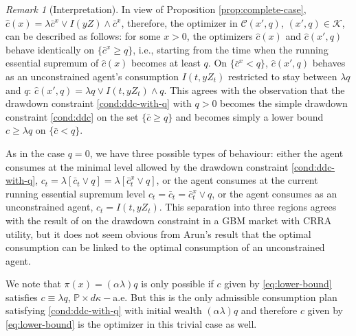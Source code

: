\documentclass[11pt, oneside]{article}   	%
\theoremstyle{plain}
\theoremstyle{definition}
\theoremstyle{remark}
\newtheorem{rem}[thm]{Remark}
\begin{document}
\begin{rem}[Interpretation]
In view of Proposition \ref{prop:complete-case}, $\hat{c}(x)=\lambda\bar{c}^x\vee I(yZ)\wedge \bar{c}^x$, therefore, the optimizer in $\mathcal{C}(x',q)$, $(x',q)\in\mathcal{K}$, can be described as follows: for some $x>0$, the optimizers $\hat{c}(x)$ and $\hat{c}(x',q)$ behave identically on $\{\bar{c}^x\geq q\}$, i.e., starting from the time when the running essential supremum of $\hat{c}(x)$ becomes at least $q$. On $\{\bar{c}^x< q\}$, $\hat{c}(x',q)$ behaves as an unconstrained agent's consumption $I(t,yZ_t)$ restricted to stay between $\lambda q$ and $q$: $\hat{c}(x',q)=\lambda q\vee I(t,yZ_t)\wedge q$. This agrees with the observation that the drawdown constraint \eqref{cond:ddc-with-q} with $q>0$ becomes the simple drawdown constraint \eqref{cond:ddc} on the set $\{\bar{c}\geq q\}$ and becomes simply a lower bound $c\geq \lambda q$ on $\{\bar{c}< q\}$.

As in the case $q=0$, we have three possible types of behaviour: either the agent consumes at the minimal level allowed by the drawdown constraint \eqref{cond:ddc-with-q}, $c_t=\lambda[\bar{c}_t\vee q]=\lambda [\bar{c}_t^{x}\vee q]$, or the agent consumes at the current running essential supremum level $c_t=\bar{c}_t=\bar{c}_t^{x}\vee q$, or the agent consumes as an unconstrained agent, $c_t=I(t,yZ_t)$. This separation into three regions agrees with the result of \cite[Theorem 1]{Arun2012} on the drawdown constraint in a GBM market with CRRA utility, but it does not seem obvious from Arun's result that the optimal consumption can be linked to the optimal consumption of an unconstrained agent.

We note that $\pi(x)=(\alpha\lambda)q$ is only possible if $c$ given by \eqref{eq:lower-bound} satisfies $c\equiv\lambda q$, $\mathbb{P}\times d\kappa-$a.e. But this is the only admissible consumption plan satisfying \eqref{cond:ddc-with-q} with initial wealth $(\alpha\lambda)q$ and therefore $c$ given by \eqref{eq:lower-bound} is the optimizer in this trivial case as well. 
\end{rem}
\end{document}
